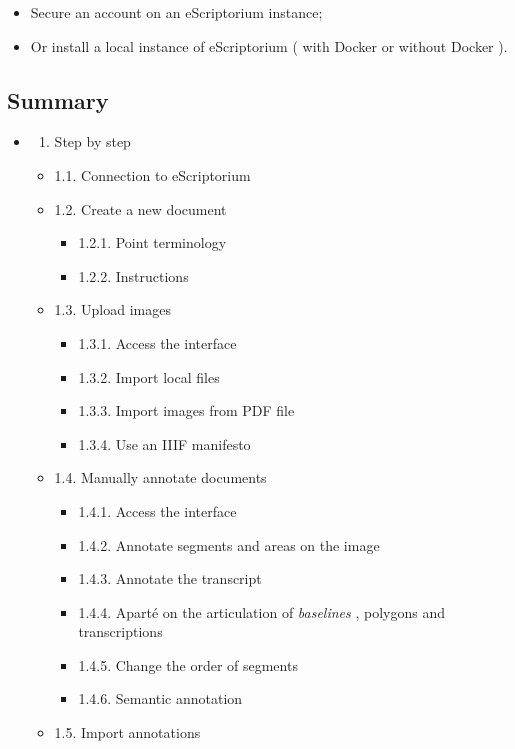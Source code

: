\documentclass[
]{book}
\providecommand{\tightlist}{%
  \setlength{\itemsep}{0pt}\setlength{\parskip}{0pt}}
\begin{document}
\begin{itemize}
\item
  Secure an account on an eScriptorium instance;
\item
  Or install a local instance of eScriptorium ( with Docker or without Docker ).
\end{itemize}

\hypertarget{summary}{%
\subsection{Summary}\label{summary}}

\begin{itemize}
\item
  \begin{enumerate}
  \def\labelenumi{\arabic{enumi}.}
  \tightlist
  \item
    Step by step
  \end{enumerate}

  \begin{itemize}
  \item
    1.1. Connection to eScriptorium
  \item
    1.2. Create a new document

    \begin{itemize}
    \item
      1.2.1. Point terminology
    \item
      1.2.2. Instructions
    \end{itemize}
  \item
    1.3. Upload images

    \begin{itemize}
    \item
      1.3.1. Access the interface
    \item
      1.3.2. Import local files
    \item
      1.3.3. Import images from PDF file
    \item
      1.3.4. Use an IIIF manifesto
    \end{itemize}
  \item
    1.4. Manually annotate documents

    \begin{itemize}
    \item
      1.4.1. Access the interface
    \item
      1.4.2. Annotate segments and areas on the image
    \item
      1.4.3. Annotate the transcript
    \item
      1.4.4. Aparté on the articulation of \emph{baselines} , polygons
      and transcriptions
    \item
      1.4.5. Change the order of segments
    \item
      1.4.6. Semantic annotation
    \end{itemize}
  \item
    1.5. Import annotations


\end{itemize}
\end{itemize}
\end{document}
